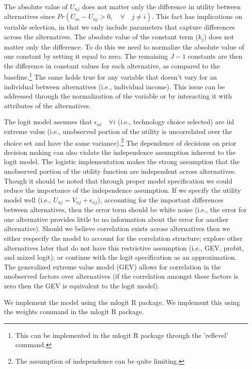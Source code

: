 \documentclass[10pt]{amsart}
\begin{document}
The absolute value of $U_{nj}$ does not matter only the difference in utility between alternatives since $Pr(U_{ni} -U_{nj} > 0, \quad \forall \quad j \neq i)$.
This fact has implications on variable selection, in that we only include parameters that capture differences across the alternatives. 
The absolute value of the constant term ($k_{j}$) does not matter only the difference.
To do this we need to normalize the absolute value of one constant by setting it equal to zero.
The remaining $J-1$ constants are then the difference in constant values for each alternative, as compared to the baseline.\footnote{This can be implemented in the mlogit R package through the 'reflevel' command.}    
The same holds true for any variable that doesn't vary for an individual between alternatives (i.e., individual income).
This issue can be addressed through the normalization of the variable or by interacting it with attributes of the alternatives. 

The logit model assumes that $\epsilon_{ni} \quad \forall i$ (i.e., technology choice selected) are iid extreme value (i.e., unobserved portion of the utility is uncorrelated over the choice set and have the same variance).\footnote{The assumption of independence can be quite limiting.}  
The dependence of decisions on prior decision making can also violate the independence assumption inherent to the logit model. 
The logistic implementation makes the strong assumption that the unobserved portion of the utility function are independent across alternatives.
Though it should be noted that through proper model specification we could reduce the importance of the independence assumption. 
If we specify the utility model well (i.e., $U_{nj} = V_{nj} + \epsilon_{nj}$), accounting for the important differences between alternatives, then the error term should be white noise (i.e., the error for one alternative provides little to no information about the error for another alternative). 
Should we believe correlation exists across alternatives then we either respecify the model to account for the correlation structure; explore other alternatives later that do not have this restrictive assumption (i.e., GEV, probit, and mixed logit); or continue with the logit specification as an approximation. 
The generalized extreme value model (GEV) allows for correlation in the unobserved factors over alternatives (if the correlation amongst these factors is zero then the GEV is equivalent to the logit model).  

We implement the model using the mlogit R package. 
We implement this using the weights command in the mlogit R package.
  
\end{document}
